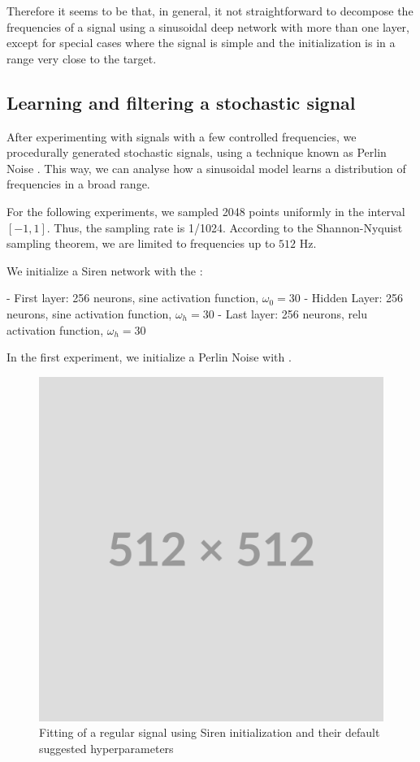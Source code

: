 Therefore it seems to be that, in general, it not straightforward to decompose the frequencies of a signal using a sinusoidal deep network with more than one layer, except for special cases where the signal is simple and the initialization is in a range very close to the target.



\subsection{Learning and filtering a stochastic signal}

After experimenting with signals with a few controlled frequencies, we procedurally generated stochastic signals, using a technique known as Perlin Noise \cite{perlin-1985}. This way, we can analyse how a sinusoidal model learns a distribution of frequencies in a broad range.


For the following experiments, we sampled 2048 points uniformly in the interval $[-1, 1]$. Thus, the sampling rate is 1/1024. According to the Shannon-Nyquist sampling theorem, we are limited to frequencies up to $512$ Hz.

We initialize a Siren network with the :

- First layer: 256 neurons, sine activation function, $\omega_0=30$
- Hidden Layer: 256 neurons, sine activation function, $\omega_h=30$
- Last layer: 256 neurons, relu activation function, $\omega_h=30$


In the first experiment, we initialize a Perlin Noise with . 

\begin{figure}
    \includegraphics[width=0.3\linewidth]{img/placeholder512.png}
    \caption{Fitting of a regular signal using Siren initialization and their default suggested hyperparameters}
\end{figure}


